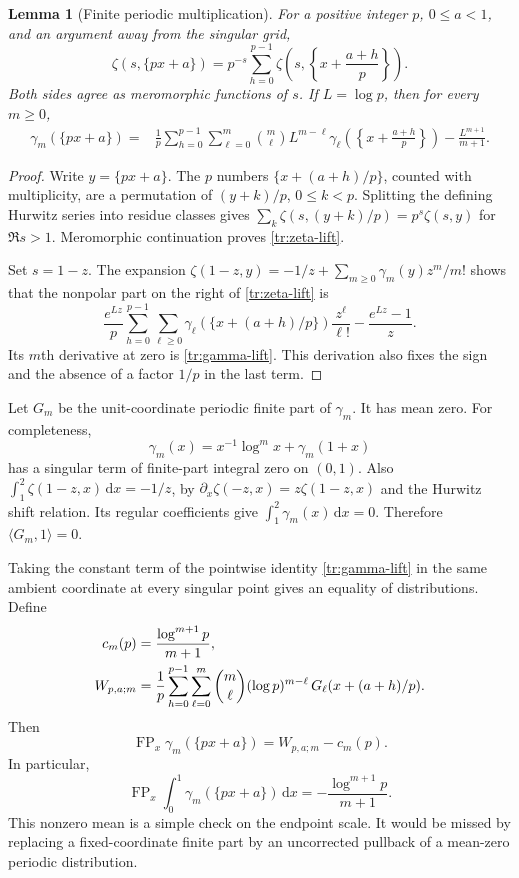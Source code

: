 \documentclass[11pt,a4paper]{article}
\numberwithin{equation}{section}
\newtheorem{lemma}[theorem]{Lemma}
\theoremstyle{definition}
\theoremstyle{remark}
\DeclareMathOperator{\FP}{FP}
\newcommand{\dd}{\,\mathrm d}
\begin{document}
\begin{lemma}[Finite periodic multiplication]\label{tr:multiplication}
For a positive integer $p$, $0\leq a<1$, and an argument away from the
singular grid,
\begin{equation}\label{tr:zeta-lift}
 \zeta(s,\{px+a\})
  =p^{-s}\sum_{h=0}^{p-1}
      \zeta\!\left(s,\left\{x+\frac{a+h}{p}\right\}\right).
\end{equation}
Both sides agree as meromorphic functions of $s$. If $L=\log p$, then
for every $m\geq0$,
\begin{align}\label{tr:gamma-lift}
 \gamma_m(\{px+a\})={}&\frac1p\sum_{h=0}^{p-1}
      \sum_{\ell=0}^m\binom m\ell L^{m-\ell}
      \gamma_\ell\!\left(\left\{x+\frac{a+h}{p}\right\}\right)
       -\frac{L^{m+1}}{m+1}.
\end{align}
\end{lemma}
\begin{proof}
Write $y=\{px+a\}$. The $p$ numbers
$\{x+(a+h)/p\}$, counted with multiplicity, are a permutation of
$(y+k)/p$, $0\leq k<p$. Splitting the defining Hurwitz series into
residue classes gives
$\sum_k\zeta(s,(y+k)/p)=p^s\zeta(s,y)$ for $\Re s>1$.
Meromorphic continuation proves \eqref{tr:zeta-lift}.

Set $s=1-z$. The expansion
$\zeta(1-z,y)=-1/z+\sum_{m\geq0}\gamma_m(y)z^m/m!$
shows that the nonpolar part on the right of \eqref{tr:zeta-lift} is
\[
 \frac{e^{Lz}}p\sum_{h=0}^{p-1}
       \sum_{\ell\geq0}\gamma_\ell(\{x+(a+h)/p\})\frac{z^\ell}{\ell!}
       -\frac{e^{Lz}-1}{z}.
\]
Its $m$th derivative at zero is \eqref{tr:gamma-lift}. This derivation
also fixes the sign and the absence of a factor $1/p$ in the last term.
\end{proof}

Let $G_m$ be the unit-coordinate periodic finite part of $\gamma_m$.
It has mean zero. For completeness,
\[
 \gamma_m(x)=x^{-1}\log^m x+\gamma_m(1+x)
\]
has a singular term of finite-part integral zero on $(0,1)$. Also
$\int_1^2\zeta(1-z,x)\dd x=-1/z$, by
$\partial_x\zeta(-z,x)=z\zeta(1-z,x)$ and the Hurwitz shift relation.
Its regular coefficients give $\int_1^2\gamma_m(x)\dd x=0$.
Therefore $\langle G_m,1\rangle=0$.

Taking the constant term of the pointwise identity
\eqref{tr:gamma-lift} in the same ambient coordinate at every singular
point gives an equality of distributions. Define
\begin{align}
 c_m(p)&=\frac{\log^{m+1}p}{m+1},\notag\\
 W_{p,a;m}&=\frac1p\sum_{h=0}^{p-1}\sum_{\ell=0}^m
       \binom m\ell(\log p)^{m-\ell}\,
              G_\ell(x+(a+h)/p).
       \label{tr:W}
\end{align}
Then
\begin{equation}\label{tr:ambient-factor}
 \FP_x\gamma_m(\{px+a\})=W_{p,a;m}-c_m(p).
\end{equation}
In particular,
\begin{equation}\label{tr:mean}
 \FP_x\int_0^1\gamma_m(\{px+a\})\dd x
       =-\frac{\log^{m+1}p}{m+1}.
\end{equation}
This nonzero mean is a simple check on the endpoint scale. It would be
missed by replacing a fixed-coordinate finite part by an uncorrected
pullback of a mean-zero periodic distribution.
\end{document}
